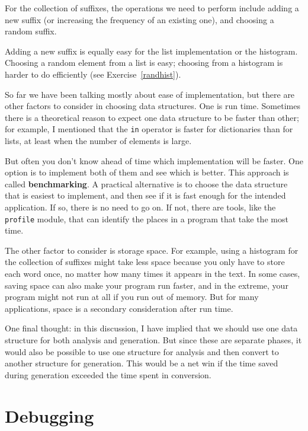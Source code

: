 \documentclass[10pt]{book}
\begin{document}
For the collection of suffixes, the operations we need to
perform include adding a new suffix (or increasing the frequency
of an existing one), and choosing a random suffix.

Adding a new suffix is equally easy for the list implementation
or the histogram.  Choosing a random element from a list
is easy; choosing from a histogram is harder to do
efficiently (see Exercise~\ref{randhist}).

So far we have been talking mostly about ease of implementation,
but there are other factors to consider in choosing data structures.
One is run time.  Sometimes there is a theoretical reason to expect
one data structure to be faster than other; for example, I mentioned
that the {\tt in} operator is faster for dictionaries than for lists,
at least when the number of elements is large.

But often you don't know ahead of time which implementation will
be faster.  One option is to implement both of them and see which
is better.  This approach is called {\bf benchmarking}.  A practical
alternative is to choose the data structure that is
easiest to implement, and then see if it is fast enough for the
intended application.  If so, there is no need to go on.  If not,
there are tools, like the {\tt profile} module, that can identify
the places in a program that take the most time.

The other factor to consider is storage space.  For example, using a
histogram for the collection of suffixes might take less space because
you only have to store each word once, no matter how many times it
appears in the text.  In some cases, saving space can also make your
program run faster, and in the extreme, your program might not run at
all if you run out of memory.  But for many applications, space is a
secondary consideration after run time.

One final thought: in this discussion, I have implied that
we should use one data structure for both analysis and generation.  But
since these are separate phases, it would also be possible to use one
structure for analysis and then convert to another structure for
generation.  This would be a net win if the time saved during
generation exceeded the time spent in conversion.


\section{Debugging}
\end{document}
